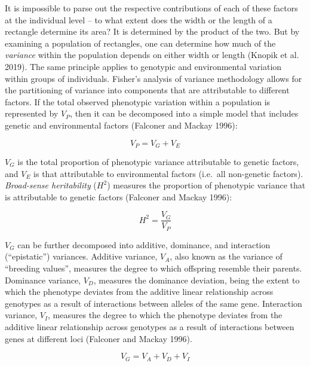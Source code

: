 \documentclass[
]{book}
\begin{document}
It is impossible to parse out the respective contributions of each of these factors at the individual level -- to what extent does the width or the length of a rectangle determine its area? It is determined by the product of the two. But by examining a population of rectangles, one can determine how much of the \emph{variance} within the population depends on either width or length (Knopik et al. 2019). The same principle applies to genotypic and environmental variation within groups of individuals. Fisher's analysis of variance methodology allows for the partitioning of variance into components that are attributable to different factors. If the total observed phenotypic variation within a population is represented by \(V_{P}\), then it can be decomposed into a simple model that includes genetic and environmental factors (Falconer and Mackay 1996):

\begin{equation}
V_{P} = V_{G} + V_{E} \label{eq:pge}
\end{equation}

\(V_{G}\) is the total proportion of phenotypic variance attributable to genetic factors, and \(V_{E}\) is that attributable to environmental factors (i.e.~all non-genetic factors). \emph{Broad-sense heritability} (\(H^2\)) measures the proportion of phenotypic variance that is attributable to genetic factors (Falconer and Mackay 1996):

\begin{equation}
H^2 = \frac{V_G}{V_P} \label{eq:heritbs}
\end{equation}

\(V_{G}\) can be further decomposed into additive, dominance, and interaction (``epistatic'') variances. Additive variance, \(V_A\), also known as the variance of ``breeding values'', measures the degree to which offspring resemble their parents. Dominance variance, \(V_D\), measures the dominance deviation, being the extent to which the phenotype deviates from the additive linear relationship across genotypes as a result of interactions between alleles of the same gene. Interaction variance, \(V_I\), measures the degree to which the phenotype deviates from the additive linear relationship across genotypes as a result of interactions between genes at different loci (Falconer and Mackay 1996).

\begin{equation}
V_G = V_A + V_D + V_I \label{eq:gendecomp}
\end{equation}
\end{document}
